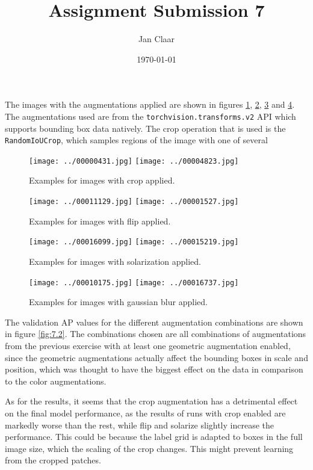 \documentclass[
    headings=optiontohead,              %
    12pt,                               %
    DIV=13,                             %
    twoside=false,                      %
    open=right,                         %
    BCOR=00mm,                          %
    toc=bibliographynumbered,            %
    parskip=half,                       %
]{scrarticle}
\title{Assignment Submission 7}
\author{Jan Claar}
\date{\today}
\begin{document}
    \head 


    The images with the augmentations applied are shown in figures \ref{fig:7.1_crop}, \ref{fig:7.1_flip}, \ref{fig:7.1_solarize} and \ref{fig:7.1_gauss}. The augmentations used are from the \texttt{torchvision.transforms.v2} API which supports bounding box data natively. The crop operation that is used is the \texttt{RandomIoUCrop}, which samples regions of the image with one of several 
    \begin{figure}[htpb]
        \centering
        \texttt{[image: ../00000431.jpg]}
        \texttt{[image: ../00004823.jpg]}
        \caption{Examples for images with crop applied.}
        \label{fig:7.1_crop}
    \end{figure}
    \begin{figure}[htpb]
        \centering
        \texttt{[image: ../00011129.jpg]}
        \texttt{[image: ../00001527.jpg]}
        \caption{Examples for images with flip applied.}
        \label{fig:7.1_flip}
    \end{figure}
    \begin{figure}[htpb]
        \centering
        \texttt{[image: ../00016099.jpg]}
        \texttt{[image: ../00015219.jpg]}
        \caption{Examples for images with solarization applied.}
        \label{fig:7.1_solarize}
    \end{figure}
    \begin{figure}[htpb]
        \centering
        \texttt{[image: ../00010175.jpg]}
        \texttt{[image: ../00016737.jpg]}
        \caption{Examples for images with gaussian blur applied.}
        \label{fig:7.1_gauss}
    \end{figure}


    The validation AP values for the different augmentation combinations are shown in figure \ref{fig:7.2}. The combinations chosen are all combinations of augmentations from the previous exercise with at least one geometric augmentation enabled, since the geometric augmentations actually affect the bounding boxes in scale and position, which was thought to have the biggest effect on the data in comparison to the color augmentations. 

    As for the results, it seems that the crop augmentation has a detrimental effect on the final model performance, as the results of runs with crop enabled are markedly worse than the rest, while flip and solarize slightly increase the performance. This could be because the label grid is adapted to boxes in the full image size, which the scaling of the crop changes. This might prevent learning from the cropped patches.
\end{document}
